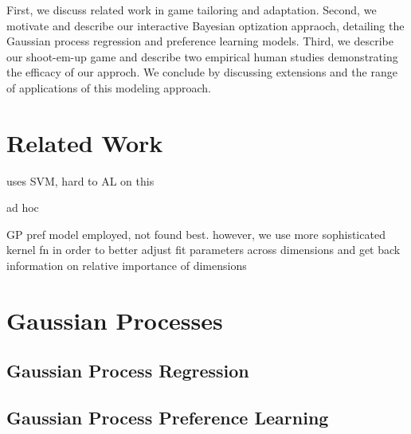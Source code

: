 \documentclass[letterpaper]{article}
\begin{document}

First, we discuss related work in game tailoring and adaptation. Second, we motivate and describe our interactive Bayesian optization appraoch, detailing the Gaussian process regression and preference learning models. Third, we describe our shoot-em-up game and describe two empirical human studies demonstrating the efficacy of our approch. We conclude by discussing extensions and the range of applications of this modeling approach.


\section{Related Work}

\cite{yu2011:minboredom} uses SVM, hard to AL on this

\cite{hunicke2004:dda} ad hoc

\cite{yannakakis2009:gameadapt} \cite{yannakakis2009:playermodel} GP pref model employed, not found best. however, we use more sophisticated kernel fn in order to better adjust fit parameters across dimensions and get back information on relative importance of dimensions

\cite{bakkes2012}

\section{Gaussian Processes}

\subsection{Gaussian Process Regression}
\cite{rasmussen2006}

\subsection{Gaussian Process Preference Learning}
\cite{chu2005} 
\end{document}
